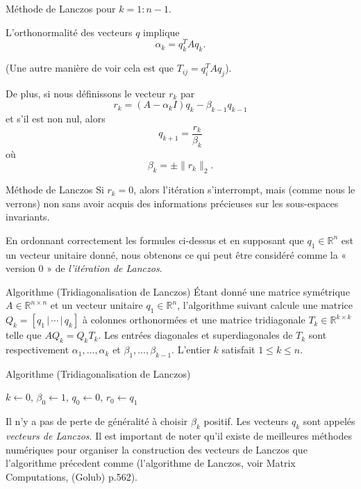 \documentclass[french, 10pt]{beamer}
\theoremstyle{definition}
\begin{document}
\begin{frame}{Méthode de Lanczos}
	pour \( k = 1 : n-1 \).
	
	L'orthonormalité des vecteurs \( q \) implique
	\[
	\alpha_k = q_k^T A q_k.
	\]
	
	(Une autre manière de voir cela est que \( T_{ij} = q_i^T A q_j \)).
	
	De plus, si nous définissons le vecteur \( r_k \) par
	\[
	r_k = (A - \alpha_k I)q_k - \beta_{k-1}q_{k-1}
	\]
	et s’il est non nul, alors
	\[
	q_{k+1} = \frac{r_k}{\beta_k}
	\]
	où
	\[
	\beta_k = \pm \|r_k\|_2.
	\]
	
	
\end{frame}
\begin{frame}{Méthode de Lanczos}
	Si \( r_k = 0 \), alors l’itération s’interrompt, mais (comme nous le verrons) non sans avoir acquis des informations précieuses sur les sous-espaces invariants.
	
	En ordonnant correctement les formules ci-dessus et en supposant que \( q_1 \in \mathbb{R}^n \) est un vecteur unitaire donné, nous obtenons ce qui peut être considéré comme la « version 0 » de \textit{l'itération de Lanczos}.
\end{frame}
\begin{frame}{Algorithme (Tridiagonalisation de Lanczos)}
	Étant donné une matrice symétrique \( A \in \mathbb{R}^{n \times n} \) et un vecteur unitaire \( q_1 \in \mathbb{R}^n \), l'algorithme suivant calcule une matrice \( Q_k = [q_1 \,|\, \cdots \,|\, q_k] \) à colonnes orthonormées et une matrice tridiagonale \( T_k \in \mathbb{R}^{k \times k} \) telle que \( AQ_k = Q_k T_k \). Les entrées diagonales et superdiagonales de \( T_k \) sont respectivement \( \alpha_1, \ldots, \alpha_k \) et \( \beta_1, \ldots, \beta_{k-1} \). L'entier \( k \) satisfait \( 1 \leq k \leq n \).
\end{frame}
\begin{frame}{Algorithme (Tridiagonalisation de Lanczos)}
	\begin{algorithm}[H]
		\SetAlgoLined
		$k \gets 0$, $\beta_0 \gets 1$, $q_0 \gets 0$, $r_0 \gets q_1$\;
	\end{algorithm}
	
	Il n'y a pas de perte de généralité à choisir \( \beta_k \) positif. Les vecteurs \( q_k \) sont appelés \textit{vecteurs de Lanczos}. Il est important de noter qu'il existe de meilleures méthodes numériques pour organiser la construction des vecteurs de Lanczos que l'algorithme précedent comme (l'algorithme de Lanczos, voir Matrix Computations, (Golub) p.562).
\end{frame}
\end{document}
